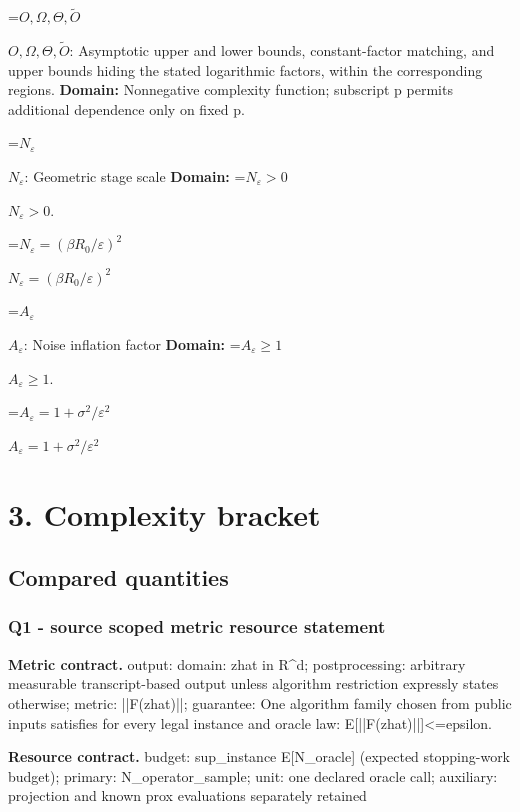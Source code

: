 \documentclass[10pt,a4paper]{article}
\newcommand{\AtlasMath}[1]{\par\begingroup\centering\setbox0=\hbox{$\displaystyle #1$}\ifdim\wd0>1.4\linewidth\typeout{ATLAS WIDE FORMULA: \the\wd0}\fi\ifdim\wd0>\linewidth\resizebox{\linewidth}{!}{\box0}\else\box0\fi\par\endgroup}
\newcommand{\AtlasInlineMath}[1]{\begingroup\setbox0=\hbox{$#1$}\ifdim\wd0>.4\linewidth\endgroup\AtlasMath{#1}\else\endgroup$#1$\fi}
\begin{document}
\AtlasInlineMath{O,\Omega,\Theta,\widetilde O}: Asymptotic upper and lower bounds, constant-factor matching, and upper bounds hiding the stated logarithmic factors, within the corresponding regions. \textbf{Domain:} Nonnegative complexity function; subscript p permits additional dependence only on fixed p.



\AtlasInlineMath{N_\varepsilon}: Geometric stage scale \textbf{Domain:} \AtlasInlineMath{N_\varepsilon>0}.



\AtlasInlineMath{N_\varepsilon=(\beta R_0/\varepsilon)^2}



\AtlasInlineMath{A_\varepsilon}: Noise inflation factor \textbf{Domain:} \AtlasInlineMath{A_\varepsilon\ge1}.



\AtlasInlineMath{A_\varepsilon=1+\sigma^2/\varepsilon^2}



\section{3. Complexity bracket}


\subsection{Compared quantities}


\subsubsection{Q1 - source scoped metric resource statement}


\textbf{Metric contract.} output: domain: zhat in R\textasciicircum{}d; postprocessing: arbitrary measurable transcript-based output unless algorithm restriction expressly states otherwise; metric: ||F(zhat)||; guarantee: One algorithm family chosen from public inputs satisfies for every legal instance and oracle law: E[||F(zhat)||]<=epsilon.



\textbf{Resource contract.} budget: sup\_instance E[N\_oracle] (expected stopping-work budget); primary: N\_operator\_sample; unit: one declared oracle call; auxiliary: projection and known prox evaluations separately retained
\end{document}
